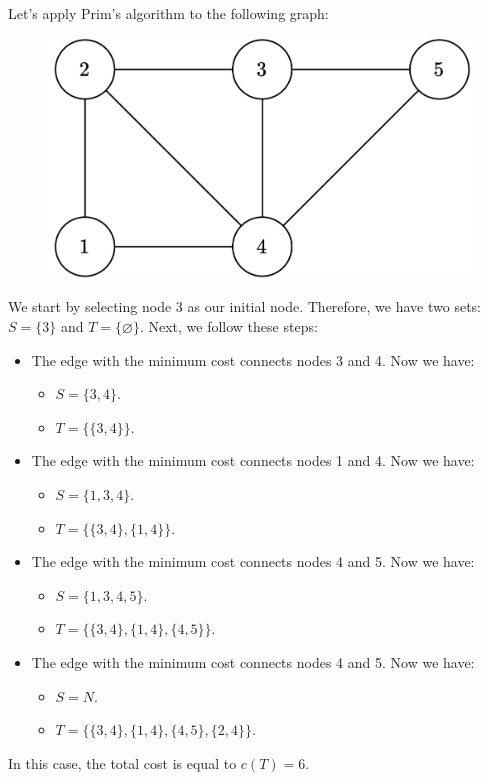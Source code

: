 \begin{example}
    Let's apply Prim's algorithm to the following graph:
    \begin{figure}[H]
        \centering
        \includegraphics[width=0.3\linewidth]{images/sgraph.png}
    \end{figure}
    We start by selecting node 3 as our initial node. 
    Therefore, we have two sets: $S=\{3\}$ and $T=\{\varnothing\}$.
    Next, we follow these steps:
    \begin{itemize}
        \item The edge with the minimum cost connects nodes 3 and 4. 
            Now we have: 
            \begin{itemize}
                \item $S=\{3,4\}$.
                \item $T=\{\{3,4\}\}$.
            \end{itemize}
        \item The edge with the minimum cost connects nodes 1 and 4. 
            Now we have:
            \begin{itemize}
                \item $S=\{1,3,4\}$. 
                \item $T=\{\{3,4\},\{1,4\}\}$.
            \end{itemize}
        \item The edge with the minimum cost connects nodes 4 and 5. 
        Now we have: 
        \begin{itemize}
            \item $S=\{1,3,4,5\}$.
            \item $T=\{\{3,4\},\{1,4\},\{4,5\}\}$.
        \end{itemize}
        \item The edge with the minimum cost connects nodes 4 and 5. 
        Now we have:
        \begin{itemize}
            \item $S=N$.
            \item $T=\{\{3,4\},\{1,4\},\{4,5\},\{2,4\}\}$.
        \end{itemize}
    \end{itemize}
    In this case, the total cost is equal to $c(T)=6$. 

\end{example}
